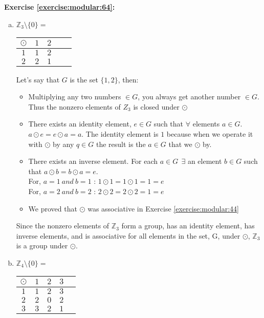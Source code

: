 \noindent\textbf{Exercise \ref{exercise:modular:64}:} %
\begin{enumerate}[(a)]
\item
\begin{center}
$\mathbb{Z}_{3} \setminus \{0\}=\ $
\begin{tabular}{c|c c c c}
$\odot$ & $1$ & $2$ \\
\hline
$1$ & $1$ & $2$	\\
$2$ & $2$ & $1$	\\
\end{tabular}
\end{center}
Let's say that $G$ is the set $\{1,2\}$, then:
\begin{itemize}
\item 
Multiplying any two numbers $\in G$, you always get another number $\in G$. Thus the nonzero elements of $Z_3$ is closed under $\odot$ 
            
\item 
There exists an identity element, $e\in G$ such that  $\forall$ elements $a\in G$. $a\odot e =e\odot a= a$. The identity element is $1$ because when we operate it with $\odot$ by any $q\in G$ the result is the $a\in G$ that we $\odot$ by.

\item 
There exists an inverse element. For each $a\in G~~\exists$ an element $b\in G$ such that $a\odot b=b\odot a=e$. \\
For, $a=1~and~b=1$ : $1\odot 1 =1\odot 1=1=e$\\
For, $a=2~and~b=2$ : $2\odot 2=2\odot 2=1= e$
            
\item 
We proved that $\odot$ was associative in Exercise \ref{exercise:modular:44}
\end{itemize}    
       
Since the nonzero elements of $\mathbb Z_{3}$ form a group, has an identity element, has inverse elements, and is associative for all elements in the set, G, under $\odot$, $\mathbb Z_{3}$ is a group under $\odot$. 

\item
\begin{center}
$\mathbb{Z}_{4} \setminus \{0\}=\ $
\begin{tabular}{c|c c c c}
$\odot$ & $1$ & $2$ & $3$\\
\hline
$1$ & $1$ & $2$ & $3$	\\
$2$ & $2$ & $0$ &	 $2$\\
$3$ & $3$ & $2$ & $1$\\
\end{tabular}
\end{center}
        

\end{enumerate}
